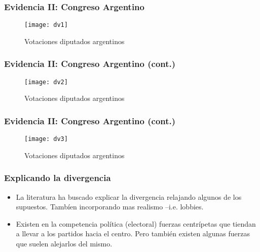\documentclass[14pt,aspectratio=169]{beamer}
\begin{document}
\begin{frame}\frametitle{Evidencia II: Congreso Argentino}
\begin{figure}[htbp]
    \centering
    \texttt{[image: dv1]}\vspace{-0.75cm}
    \caption{Votaciones diputados argentinos}
    \label{fig:dv1}
  \end{figure}
\end{frame}


\begin{frame}\frametitle{Evidencia II: Congreso Argentino (cont.)}
\begin{figure}[htbp]
    \centering
    \texttt{[image: dv2]}\vspace{-0.75cm}
    \caption{Votaciones diputados argentinos}
    \label{fig:dv1}
  \end{figure}
\end{frame}


\begin{frame}\frametitle{Evidencia II: Congreso Argentino (cont.)}
\begin{figure}[htbp]
    \centering
    \texttt{[image: dv3]}\vspace{-0.75cm}
    \caption{Votaciones diputados argentinos}
    \label{fig:dv1}
  \end{figure}
\end{frame}




\begin{frame}\frametitle{Explicando la divergencia}
\begin{itemize}
\item La literatura ha buscado explicar la divergencia relajando
  algunos de los supuestos. Tambíen incorporando mas realismo
  --i.e. lobbies.
\item Existen en la competencia política (electoral) fuerzas
  centrípetas que tiendan a llevar a los partidos hacia el
  centro. Pero también existen algunas fuerzas que suelen alejarlos
  del mismo. 
\end{itemize}
\end{frame}
\end{document}
